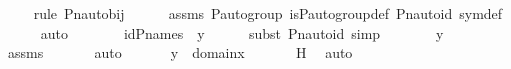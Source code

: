 \begin{isabellebody}
\ \ \ \ \isamarkupfalse%
{\isacharparenleft}{\kern0pt}rule\ Pn{\isacharunderscore}{\kern0pt}auto{\isacharunderscore}{\kern0pt}bij{\isacharparenright}{\kern0pt}\isanewline
\ \ \ \ \isamarkupfalse%
\ assms\ {\isasymG}{\isacharunderscore}{\kern0pt}P{\isacharunderscore}{\kern0pt}auto{\isacharunderscore}{\kern0pt}group\ is{\isacharunderscore}{\kern0pt}P{\isacharunderscore}{\kern0pt}auto{\isacharunderscore}{\kern0pt}group{\isacharunderscore}{\kern0pt}def\ Pn{\isacharunderscore}{\kern0pt}auto{\isacharunderscore}{\kern0pt}id\ sym{\isacharunderscore}{\kern0pt}def\isanewline
\ \ \ \ \isamarkupfalse%
\ auto\isanewline
\ \ \isamarkupfalse%
\ \isamarkupfalse%
\ {\isachardoublequoteopen}{\isachardot}{\kern0pt}{\isachardot}{\kern0pt}{\isachardot}{\kern0pt}\ {\isacharequal}{\kern0pt}\ id{\isacharparenleft}{\kern0pt}P{\isacharunderscore}{\kern0pt}names{\isacharparenright}{\kern0pt}\ {\isacharbackquote}{\kern0pt}\ y{\isachardoublequoteclose}\ \isanewline
\ \ \ \ \isamarkupfalse%
{\isacharparenleft}{\kern0pt}subst\ Pn{\isacharunderscore}{\kern0pt}auto{\isacharunderscore}{\kern0pt}id{\isacharcomma}{\kern0pt}\ simp{\isacharparenright}{\kern0pt}\isanewline
\ \ \isamarkupfalse%
\ \isamarkupfalse%
\ {\isachardoublequoteopen}{\isachardot}{\kern0pt}{\isachardot}{\kern0pt}{\isachardot}{\kern0pt}\ {\isacharequal}{\kern0pt}\ y{\isachardoublequoteclose}\ \isanewline
\ \ \ \ \isamarkupfalse%
\ assms\ \isanewline
\ \ \ \ \isamarkupfalse%
\ auto\ \isanewline
\ \ \isamarkupfalse%
\ \isamarkupfalse%
\ {\isachardoublequoteopen}y\ {\isasymin}\ domain{\isacharparenleft}{\kern0pt}x{\isacharparenright}{\kern0pt}{\isachardoublequoteclose}\ \isanewline
\ \ \ \ \isamarkupfalse%
\ H\ \isamarkupfalse%
\ auto\isanewline
{}\isamarkupfalse%
%
\endisatagproof
{\isafoldproof}%
%
\isadelimproof
\isanewline
%
\endisadelimproof
\isanewline
{}\isamarkupfalse%
\isanewline
%
\isadelimtheory
%
\endisadelimtheory
%
\isatagtheory
{}\isamarkupfalse%
%
\endisatagtheory
{\isafoldtheory}%
%
\isadelimtheory
%
\endisadelimtheory
%
\end{isabellebody}%
\endinput
